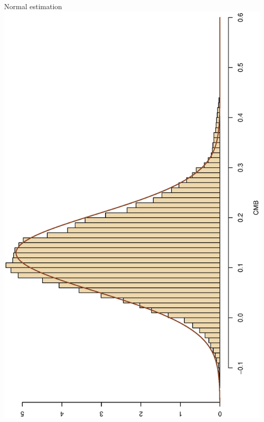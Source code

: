 \begin{slide}
\begin{block}{}
Normal estimation
\includegraphics[height=5truecm,width=5truecm,angle=270]{figures/CMBnor}
\end{block}
\end{slide}

